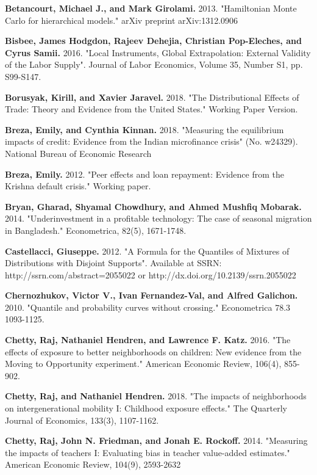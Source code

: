 \documentclass[AER]{AEA}
\begin{document}
\begin{thebibliography}{99}
 \textbf{ Betancourt, Michael J., and Mark Girolami.} 2013. "Hamiltonian Monte Carlo for hierarchical models." arXiv preprint arXiv:1312.0906

\textbf{  Bisbee, James Hodgdon, Rajeev Dehejia, Christian Pop-Eleches, and Cyrus Samii.} 2016. "Local Instruments, Global Extrapolation: External Validity of the Labor Supply". Journal of Labor Economics, Volume 35, Number S1, pp. S99-S147.

 \textbf{ Borusyak, Kirill, and Xavier Jaravel.} 2018. "The Distributional Effects of Trade: Theory and Evidence from the United States." Working Paper Version.

 \textbf{ Breza, Emily, and Cynthia Kinnan.} 2018. "Measuring the equilibrium impacts of credit: Evidence from the Indian microfinance crisis" (No. w24329). National Bureau of Economic Research

 \textbf{ Breza, Emily.} 2012. "Peer effects and loan repayment: Evidence from the Krishna default crisis." Working paper.

 \textbf{ Bryan, Gharad, Shyamal Chowdhury, and Ahmed Mushfiq Mobarak.} 2014. "Underinvestment in a profitable technology: The case of seasonal migration in Bangladesh." Econometrica, 82(5), 1671-1748.

 \textbf{ Castellacci, Giuseppe.} 2012. "A Formula for the Quantiles of Mixtures of Distributions with Disjoint Supports". Available at SSRN: http://ssrn.com/abstract=2055022 or http://dx.doi.org/10.2139/ssrn.2055022

 \textbf{ Chernozhukov, Victor V., Ivan Fernandez-Val, and Alfred Galichon.} 2010. "Quantile and probability curves without crossing." Econometrica 78.3  1093-1125.

 \textbf{ Chetty, Raj, Nathaniel Hendren, and Lawrence F. Katz.} 2016. "The effects of exposure to better neighborhoods on children: New evidence from the Moving to Opportunity experiment." American Economic Review, 106(4), 855-902.

 \textbf{ Chetty, Raj, and Nathaniel Hendren.} 2018. "The impacts of neighborhoods on intergenerational mobility I: Childhood exposure effects." The Quarterly Journal of Economics, 133(3), 1107-1162.

 \textbf{ Chetty, Raj, John N. Friedman, and Jonah E. Rockoff.} 2014. "Measuring the impacts of teachers I: Evaluating bias in teacher value-added estimates." American Economic Review, 104(9), 2593-2632


\end{thebibliography}
\end{document}
